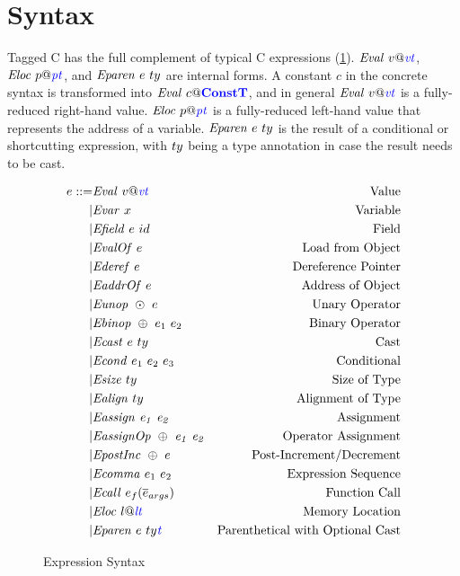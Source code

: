 \documentclass{llncs}
\begin{document}
\section{Syntax}

Tagged C has the full complement of typical C expressions (\cref{fig:expr}). \(\mathit{Eval} ~ v@\mathit{\color{blue} vt}\),
\(\mathit{Eloc} ~ p@\mathit{\color{blue} pt}\), and \(\mathit{Eparen} ~ e ~ ty\) are internal forms.
A constant \(c\) in the concrete syntax is transformed into \(\mathit{Eval} ~ c@\color{blue} \mathbf{ConstT}\),
and in general \(\mathit{Eval} ~ v@\mathit{\color{blue} vt}\) is a fully-reduced right-hand value. \(\mathit{Eloc} ~ p@\mathit{\color{blue} pt}\)
is a fully-reduced left-hand value that represents the address of a variable.
\(\mathit{Eparen} ~ e ~ ty\) is the result of a conditional or shortcutting
expression, with \(ty\) being a type annotation in case the result needs to
be cast.

\begin{figure}
  \[\begin{aligned}
  e ::= & \mathit{Eval} ~ v@\mathit{\color{blue} vt} & \textnormal{Value} \\
  | & \mathit{Evar} ~ x & \textnormal{Variable} \\
  | & \mathit{Efield} ~ e ~ id & \textnormal{Field} \\
  | & \mathit{EvalOf} ~ e & \textnormal{Load from Object} \\
  | & \mathit{Ederef} ~ e & \textnormal{Dereference Pointer} \\
  | & \mathit{EaddrOf} ~ e & \textnormal{Address of Object} \\
  | & \mathit{Eunop} ~ \odot ~ e & \textnormal{Unary Operator} \\
  | & \mathit{Ebinop} ~ \oplus ~ e_1 ~ e_2 & \textnormal{Binary Operator} \\
  | & \mathit{Ecast} ~ e ~ ty & \textnormal{Cast} \\
  | & \mathit{Econd} ~ e_1 ~ e_2 ~ e_3 & \textnormal{Conditional} \\
  | & \mathit{Esize} ~ ty & \textnormal{Size of Type} \\
  | & \mathit{Ealign} ~ ty & \textnormal{Alignment of Type} \\
  | & \mathit{Eassign ~ e_1 ~ e_2} & \textnormal{Assignment} \\
  | & \mathit{EassignOp ~ \oplus ~ e_1 ~ e_2} & \textnormal{Operator Assignment} \\
  | & \mathit{EpostInc} ~ \oplus ~ e & \textnormal{Post-Increment/Decrement} \\
  | & \mathit{Ecomma} ~ e_1 ~ e_2 & \textnormal{Expression Sequence} \\
  | & \mathit{Ecall} ~ e_f(\overline{e}_{args}) & \textnormal{Function Call} \\
  | & \mathit{Eloc} ~ l@\mathit{\color{blue} lt} & \textnormal{Memory Location} \\
  | & \mathit{Eparen} ~ e ~ ty{\mathit{\color{blue} t}} & \textnormal{Parenthetical with Optional Cast} \\
  \end{aligned}\]
  \caption{Expression Syntax}
  \label{fig:expr}
\end{figure}
\end{document}
